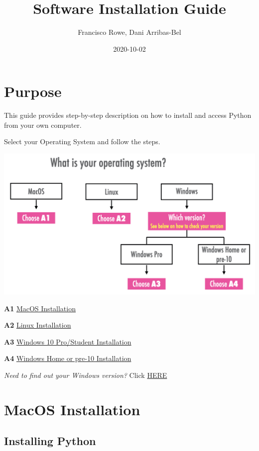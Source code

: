 \documentclass[
]{book}
\title{Software Installation Guide}
\author{Francisco Rowe, Dani Arribas-Bel}
\date{2020-10-02}
\begin{document}
\maketitle

{
\setcounter{tocdepth}{1}
\tableofcontents
}
\hypertarget{purpose}{%
\chapter*{Purpose}\label{purpose}}

This guide provides step-by-step description on how to install and access Python from your own computer.

Select your Operating System and follow the steps.

\begin{center}\includegraphics[width=17.97in]{figs/intro/tree} \end{center}

\textbf{A1} \href{mac.html}{MacOS Installation}

\textbf{A2} \href{linux.html}{Linux Installation}

\textbf{A3} \href{win10pro.html}{Windows 10 Pro/Student Installation}

\textbf{A4} \href{otherwin.html}{Windows Home or pre-10 Installation}

\emph{Need to find out your Windows version?} Click \href{windows-version}{HERE}

\hypertarget{macos-installation}{%
\chapter*{MacOS Installation}\label{macos-installation}}

\hypertarget{installing-python}{%
\section*{Installing Python}\label{installing-python}}
\end{document}
